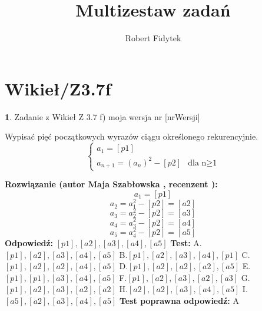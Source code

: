 \documentclass[12pt, a4paper]{article}
\title{Multizestaw zadań}
\author{Robert Fidytek}
\date{}
\theoremstyle{definition} %
\newtheorem{zad}{}
\newcommand{\kategoria}[1]{\section{#1}} %
\newcommand{\zadStart}[1]{\begin{zad}#1\newline} %
\newcommand{\zadStop}{\end{zad}}   %
\newcommand{\rozwStart}[2]{\noindent \textbf{Rozwiązanie (autor #1 , recenzent #2): }\newline} %
\newcommand{\rozwStop}{\newline}                                            %
\newcommand{\odpStart}{\noindent \textbf{Odpowiedź:}\newline}    %
\newcommand{\odpStop}{\newline}                                             %
\newcommand{\testStart}{\noindent \textbf{Test:}\newline} %
\newcommand{\testStop}{\newline} %
\newcommand{\kluczStart}{\noindent \textbf{Test poprawna odpowiedź:}\newline} %
\newcommand{\kluczStop}{\newline} %
\begin{document}
\maketitle


\kategoria{Wikieł/Z3.7f}
\zadStart{Zadanie z Wikieł Z 3.7 f)  moja wersja nr [nrWersji]}

Wypisać pięć początkowych wyrazów ciągu określonego rekurencyjnie.
$$\left\{ \begin{array}{ll}
a_{1}=[p1]\\
a_{n+1}=(a_{n})^{2}-[p2]& \textrm{dla n$\geq$1} 
\end{array} \right.
$$
\zadStop
\rozwStart{Maja Szabłowska}{}
$$a_{1}=[p1]$$
$$a_{2}=a_{1}^{2}- [p2]=[a2]$$
$$a_{3}=a_{2}^{2}- [p2]=[a3]$$
$$a_{4}=a_{3}^{2}-[p2]=[a4]$$
$$a_{5}=a_{4}^{2}- [p2]=[a5]$$
\rozwStop
\odpStart
$[p1],[a2],[a3],[a4],[a5]$
\odpStop
\testStart
A.$[p1],[a2],[a3],[a4],[a5]$
B.$[p1],[a2],[a3],[a4],[p1]$
C.$[p1],[a2],[a2],[a4],[a5]$
D.$[p1],[a2],[a2],[a2],[a5]$
E.$[p1],[p1],[a3],[a4],[a5]$
F.$[p1],[a2],[a3],[a2],[a3]$
G.$[p1],[a2],[a3],[a2],[a2]$
H.$[a2],[a2],[a3],[a4],[a5]$
I.$[a5],[a2],[a3],[a4],[a5]$
\testStop
\kluczStart
A
\kluczStop
\end{document}
